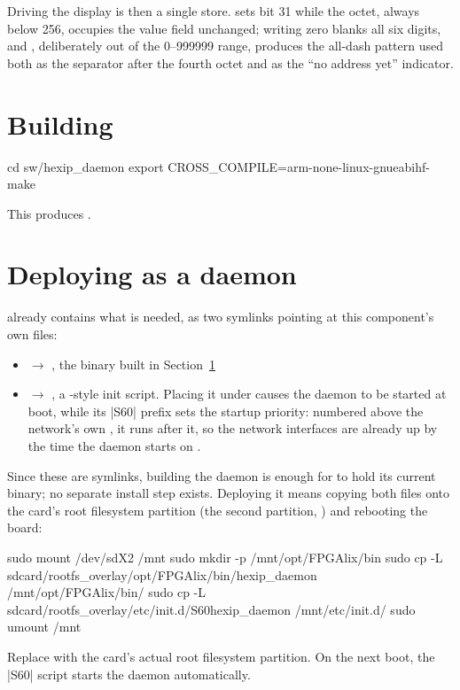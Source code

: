 Driving the display is then a single store.  sets bit 31 while the octet, always below 256, occupies the value field unchanged; writing zero blanks all six digits, and , deliberately out of the 0--999999 range, produces the all-dash pattern used both as the separator after the fourth octet and as the ``no address yet'' indicator.

\section{Building}
\label{sec:fpgalix-hexip-building}

\begin{shellcodehost}
cd sw/hexip_daemon
export CROSS_COMPILE=arm-none-linux-gnueabihf-
make
\end{shellcodehost}

This produces .

\section{Deploying as a daemon}
\label{sec:fpgalix-hexip-deploying}

 already contains what is needed, as two symlinks pointing at this component's own files:

\begin{itemize}
    \item {} $\rightarrow$ , the binary built in Section~\ref{sec:fpgalix-hexip-building}
    \item {} $\rightarrow$ , a -style init script. Placing it under  causes the daemon to be started at boot, while its |S60| prefix sets the startup priority: numbered above the network's own , it runs after it, so the network interfaces are already up by the time the daemon starts on .
\end{itemize}

Since these are symlinks, building the daemon is enough for  to hold its current binary; no separate install step exists. Deploying it means copying both files onto the  card's root filesystem partition (the second partition, ) and rebooting the board:

\begin{shellcodehost}
sudo mount /dev/sdX2 /mnt
sudo mkdir -p /mnt/opt/FPGAlix/bin
sudo cp -L sdcard/rootfs_overlay/opt/FPGAlix/bin/hexip_daemon /mnt/opt/FPGAlix/bin/
sudo cp -L sdcard/rootfs_overlay/etc/init.d/S60hexip_daemon /mnt/etc/init.d/
sudo umount /mnt
\end{shellcodehost}

Replace  with the  card's actual root filesystem partition. On the next boot, the |S60| script starts the daemon automatically.
